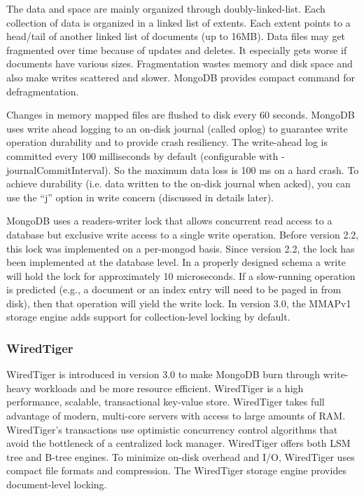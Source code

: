 \documentclass[11pt]{book}
\begin{document}
The data and space are mainly organized through doubly-linked-list. Each collection of data is organized in a linked list of extents. Each extent points to a head/tail of another linked list of documents (up to 16MB). Data files may get fragmented over time because of updates and deletes. It especially gets worse if documents have various sizes. Fragmentation wastes memory and disk space and also make writes scattered and slower. MongoDB provides compact command for defragmentation.

Changes in memory mapped files are flushed to disk every 60 seconds. MongoDB uses write ahead logging to an on-disk journal (called oplog) to guarantee write operation durability and to provide crash resiliency. The write-ahead log is committed every 100 milliseconds by default (configurable with -journalCommitInterval). So the maximum data loss is 100 ms on a hard crash. To achieve durability (i.e. data written to the on-disk journal when acked), you can use the ``j'' option in write concern (discussed in details later).

MongoDB uses a readers-writer lock that allows concurrent read access to a database but exclusive write access to a single write operation. Before version 2.2, this lock was implemented on a per-mongod basis. Since version 2.2, the lock has been implemented at the database level. In a properly designed schema a write will hold the lock for approximately 10 microseconds. If a slow-running operation is predicted (e.g., a document or an index entry will need to be paged in from disk), then that operation will yield the write lock. In version 3.0, the MMAPv1 storage engine adds support for collection-level locking by default.

\subsubsection{WiredTiger}
WiredTiger \cite{WiredTiger} is introduced in version 3.0 to make MongoDB burn through write-heavy workloads and be more resource efficient.
WiredTiger is a high performance, scalable, transactional key-value store. WiredTiger takes full advantage of modern, multi-core servers with access to large amounts of RAM. WiredTiger's transactions use optimistic concurrency control algorithms that avoid the bottleneck of a centralized lock manager. WiredTiger offers both LSM tree and B-tree engines. To minimize on-disk overhead and I/O, WiredTiger uses compact file formats and compression.
The WiredTiger storage engine provides document-level locking.
\end{document}
